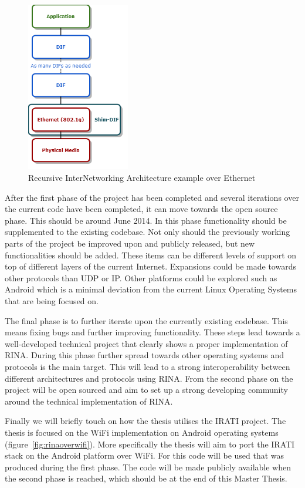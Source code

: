 \npar
\begin{figure}[H]
    \centering
    \includegraphics[width=0.4\textwidth]{figures/rinaoverethernet}
    \caption{Recursive InterNetworking Architecture example over Ethernet} 
    \label{fig:rinaoverethernet}
\end{figure}

\npar

After the first phase of the project has been completed and several iterations over the current code have been completed, it can move towards the open source phase. This should be around June 2014. In this phase functionality should be supplemented to the existing codebase. Not only should the previously working parts of the project be improved upon and publicly released, but new functionalities should be added. These items can be different levels of support on top of different layers of the current Internet. Expansions could be made towards other protocols than UDP or IP. Other platforms could be explored such as Android which is a minimal deviation from the current Linux Operating Systems that are being focused on. 

\npar
The final phase is to further iterate upon the currently existing codebase. This means fixing bugs and further improving functionality. These steps lead towards a well-developed technical project that clearly shows a proper implementation of RINA. During this phase further spread towards other operating systems and protocols is the main target. This will lead to a strong interoperability between different architectures and protocols using RINA. From the second phase on the project will be open sourced and aim to set up a strong developing community around the technical implementation of RINA. 

\npar

Finally we will briefly touch on how the thesis utilises the IRATI project. The thesis is focused on the WiFi implementation on Android operating systems (figure~\ref{fig:rinaoverwifi}). More specifically the thesis will aim to port the IRATI stack on the Android platform over WiFi. For this code will be used that was produced during the first phase. The code will be made publicly available when the second phase is reached, which should be at the end of this Master Thesis. 


